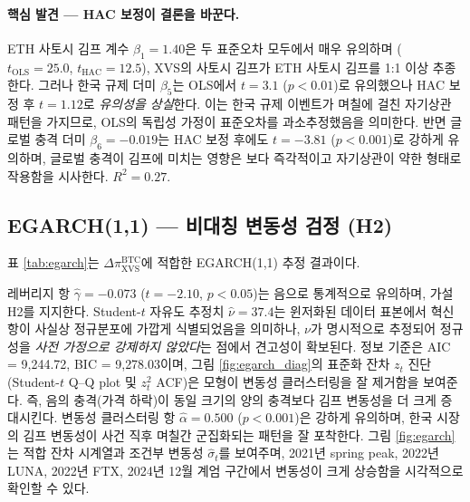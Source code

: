 \documentclass[11pt,a4paper]{article}
\begin{document}
\begin{table}[H]
\centering
\caption{식 \eqref{eq:reg}의 OLS 추정 결과 ($N=1{,}904$, 종속변수 $\pi^{\text{BTC}}_{\text{XVS}}$)}
\label{tab:regression}

\end{table}

\paragraph{핵심 발견 --- HAC 보정이 결론을 바꾼다.}
ETH 사토시 김프 계수 $\beta_1=1.40$은 두 표준오차 모두에서 매우 유의하며 ($t_{\text{OLS}}=25.0$,
$t_{\text{HAC}}=12.5$), XVS의 사토시 김프가 ETH 사토시 김프를 1:1 이상 추종한다.
그러나 한국 규제 더미 $\beta_5$는 OLS에서 $t=3.1$ ($p<0.01$)로 유의했으나 HAC 보정 후 $t=1.12$로
\emph{유의성을 상실}한다. 이는 한국 규제 이벤트가 며칠에 걸친 자기상관 패턴을 가지므로,
OLS의 독립성 가정이 표준오차를 과소추정했음을 의미한다. 반면 글로벌 충격 더미 $\beta_6=-0.019$는
HAC 보정 후에도 $t=-3.81$ ($p<0.001$)로 강하게 유의하며, 글로벌 충격이 김프에 미치는 영향은
보다 즉각적이고 자기상관이 약한 형태로 작용함을 시사한다. $R^2=0.27$.

\subsection{EGARCH(1,1) --- 비대칭 변동성 검정 (H2)}

표 \ref{tab:egarch}는 $\Delta\pi^{\text{BTC}}_{\text{XVS}}$에 적합한 EGARCH(1,1) 추정 결과이다.

\begin{table}[H]
\centering
\caption{EGARCH(1,1) 추정 결과 ($N=1{,}903$, 종속변수 $\Delta\pi^{\text{BTC}}_{\text{XVS}}$)}
\label{tab:egarch}

\end{table}

레버리지 항 $\hat\gamma = -0.073$ ($t=-2.10$, $p<0.05$)는 음으로 통계적으로 유의하며, 가설 H2를 지지한다. Student-$t$ 자유도 추정치 $\hat\nu=37.4$는 윈저화된 데이터 표본에서 혁신항이 사실상 정규분포에 가깝게 식별되었음을 의미하나, $\nu$가 명시적으로 추정되어 정규성을 \emph{사전 가정으로 강제하지 않았다}는 점에서 견고성이 확보된다. 정보 기준은 AIC = 9{,}244.72, BIC = 9{,}278.03이며, 그림 \ref{fig:egarch_diag}의 표준화 잔차 $z_t$ 진단(Student-$t$ Q--Q plot 및 $z_t^2$ ACF)은 모형이 변동성 클러스터링을 잘 제거함을 보여준다. 즉, 음의 충격(가격 하락)이 동일 크기의 양의 충격보다 김프 변동성을 더 크게
증대시킨다. 변동성 클러스터링 항 $\hat\alpha=0.500$ ($p<0.001$)은 강하게 유의하며, 한국 시장의
김프 변동성이 사건 직후 며칠간 군집화되는 패턴을 잘 포착한다.
그림 \ref{fig:egarch}는 적합 잔차 시계열과 조건부 변동성 $\hat\sigma_t$를 보여주며,
2021년 spring peak, 2022년 LUNA, 2022년 FTX, 2024년 12월 계엄 구간에서 변동성이 크게 상승함을
시각적으로 확인할 수 있다.
\end{document}
